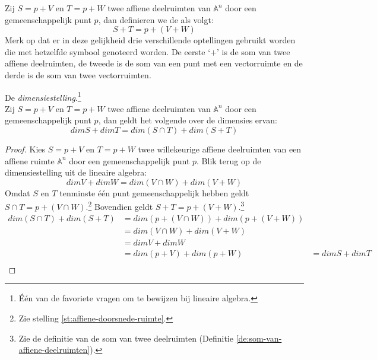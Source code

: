 \documentclass[main.tex]{subfiles}
\begin{document}
\begin{de}
\label{de:som-van-affiene-deelruimten}
  Zij $S = p + V$ en $T = p + W$ twee affiene deelruimten van $\mathbb{A}^{n}$ door een gemeenschappelijk punt $p$, dan definieren we de  als volgt:
  \[ S + T = p + (V + W) \]
  Merk op dat er in deze gelijkheid drie verschillende optellingen gebruikt worden die met hetzelfde symbool genoteerd worden. De eerste `$+$' is de som van twee affiene deelruimten, de tweede is de som van een punt met een vectorruimte en de derde is de som van twee vectorruimten.
\end{de}

\begin{st}
  \label{st:dimensiestelling}
  De \emph{dimensiestelling}.\footnote{\'E\'en van de favoriete vragen om te bewijzen bij lineaire algebra.}\\
  Zij $S = p + V$ en $T = p + W$ twee affiene deelruimten van $\mathbb{A}^{n}$ door een gemeenschappelijk punt $p$, dan geldt het volgende over de dimensies ervan:
  \[ dim S + dim T = dim(S \cap T) + dim (S + T) \]

  \begin{proof}
    Kies $S = p + V$ en $T = p + W$ twee willekeurige affiene deelruimten van een affiene ruimte $\mathbb{A}^{n}$ door een gemeenschappelijk punt $p$.
    Blik terug op de dimensiestelling uit de lineaire algebra:
    \[ dim V + dim W = dim(V \cap W) + dim (V + W) \]
    Omdat $S$ en $T$ tenminste \'e\'en punt gemeenschappelijk hebben geldt $S \cap T = p + (V \cap W)$.\footnote{Zie stelling \ref{st:affiene-doorsnede-ruimte}.} Bovendien geldt $S + T = p + (V + W)$.\footnote{Zie de definitie van de som van twee deelruimten (Definitie \ref{de:som-van-affiene-deelruimten}).} 
    \[
    \begin{array}{rll}
       dim(S \cap T) + dim (S + T) &= dim(p + (V \cap W)) + dim(p + (V + W)) &\\
                    &= dim(V \cap W) + dim (V + W)&\\
                    &= dim V + dim W&\\
                    &= dim(p + V) + dim(p + W) &= dim S + dim T\\
    \end{array}
    \]

  \end{proof}
\end{st}
\end{document}
